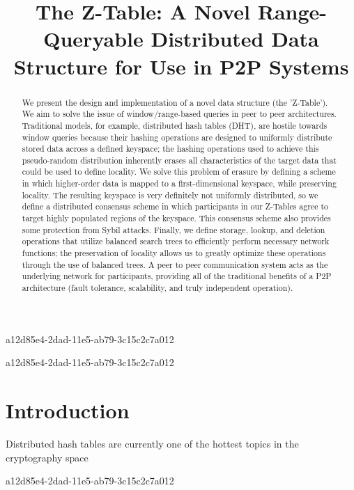 \documentclass[12pt]{article}
\title{The Z-Table: A Novel Range-Queryable Distributed Data Structure for Use in P2P Systems}
\begin{document}
a12d85e4-2dad-11e5-ab79-3c15c2c7a012\maketitle

\begin{abstract}
We present the design and implementation of a novel data structure (the 'Z-Table'). We aim to solve the issue of window/range-based queries in peer to peer architectures. Traditional models, for example,  distributed hash tables (DHT), are hostile towards window queries because their hashing operations are designed to uniformly distribute stored data across a defined keyspace; the hashing operations used to achieve this pseudo-random distribution inherently erases all characteristics of the target data that could be used to define locality. We solve this problem of erasure by defining a scheme in which higher-order data is mapped to a first-dimensional keyspace, while preserving locality. The resulting keyspace is very definitely not uniformly distributed, so we define a distributed consensus scheme in which participants in our Z-Tables agree to target highly populated regions of the keyspace. This consensus scheme also provides some protection from Sybil attacks. Finally, we define storage, lookup, and deletion operations that utilize balanced search trees to efficiently perform necessary network functions; the preservation of locality allows us to greatly optimize these operations through the use of balanced trees. A peer to peer communication system acts as the underlying network for participants, providing all of the traditional benefits of a P2P architecture (fault tolerance, scalability, and truly independent operation).
\end{abstract}


a12d85e4-2dad-11e5-ab79-3c15c2c7a012\newpage
\section{Introduction}
Distributed hash tables are currently one of the hottest topics in the cryptography space~\cite{Stoica:2001dj,Rowstron:2001ea,Ratnasamy:2001wn}

a12d85e4-2dad-11e5-ab79-3c15c2c7a012\printbibliography
\end{document}
